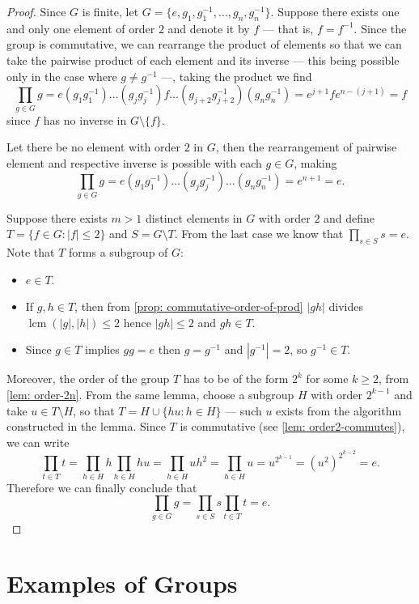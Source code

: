 \begin{proof}
Since \(G\) is finite, let \(G = \{e, g_1, g_1^{-1}, \dots, g_n, g_n^{-1}\}\).
Suppose there exists one and only one element of order \(2\) and denote it by
\(f\) --- that is, \(f = f^{-1}\). Since the group is commutative, we can
rearrange the product of elements so that we can take the pairwise product of
each element and its inverse --- this being possible only in the case where
\(g \neq g^{-1}\) ---, taking the product we find
\[
  \prod_{g \in G} g = e (g_1 g_1^{-1}) \dots (g_j g_j^{-1}) f \dots (g_{j + 2}
  g_{j + 2}^{-1}) (g_n g_n^{-1}) = e^{j + 1} f e^{n - (j + 1)} = f
\]
since \(f\) has no inverse in \(G \setminus \{f\}\).

Let there be no element with order \(2\) in \(G\), then the rearrangement of
pairwise element and respective inverse is possible with each \(g \in G\),
making
\[
  \prod_{g \in G} g = e (g_1 g_1^{-1}) \dots (g_j g_j^{-1}) \dots (g_n
  g_n^{-1}) = e^{n + 1} = e.
\]

Suppose there exists \(m > 1\) distinct elements in \(G\) with order \(2\) and
define \(T = \{f \in G \colon |f| \leq 2\}\) and \(S = G \setminus T\). From the
last case we know that \(\prod_{s \in S} s = e\). Note that \(T\) forms a
subgroup of \(G\):
\begin{itemize}
  \item \(e \in T\).
  \item If \(g, h \in T\), then from \cref{prop: commutative-order-of-prod}
    \(|gh|\) divides \(\operatorname{lcm}(|g|, |h|) \leq 2\) hence \(|gh| \leq
    2\) and \(gh \in T\).
  \item Since \(g \in T\) implies \(g g = e\) then \(g = g^{-1}\) and
    \(|g^{-1}| = 2\), so \(g^{-1} \in T\).
\end{itemize}
Moreover, the order of the group \(T\) has to be of the form \(2^k\) for some
\(k \geq 2\), from \cref{lem: order-2n}. From the same lemma, choose a
subgroup \(H\) with order \(2^{k-1}\) and take \(u \in T \setminus H\), so
that \(T = H \cup \{hu \colon h \in H\}\) --- such \(u\) exists from the algorithm
constructed in the lemma. Since \(T\) is commutative (see \cref{lem:
order2-commutes}), we can write
\[
  \prod_{t \in T} t = \prod_{h \in H} h \prod_{h \in H} hu = \prod_{h \in H} u
  h^2 = \prod_{h \in H} u = u^{2^{k-1}} = (u^2)^{2^{k-2}} = e.
\]
Therefore we can finally conclude that
\[
  \prod_{g \in G} g = \prod_{s \in S} s \prod_{t \in T} t = e.
\]
\end{proof}

\section{Examples of Groups}

